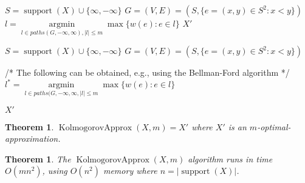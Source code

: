 \documentclass{article}
\newtheorem{theorem}[thm]{Theorem}
\DeclareMathOperator{\support}{support}
\DeclareMathOperator{\KlmApprox}{KolmogorovApprox}
\begin{document}
\begin{algorithm}\label{alg:optapprox}
	\DontPrintSemicolon
	$S = \support(X)\cup \{\infty,-\infty\}$\;
	$G=(V,E)=(S, \{ e=(x,y) \in S^2 \colon  x<y \})$  \;
	$ l = \operatorname{argmin}\limits_{l \in paths(G,-\infty,\infty),|l|\leq m}  \max \{ w(e)\colon e \in l  \}$  \;
	\Return $X'$\;
	
	\caption{$\KlmApprox (X, m)$}  
	\label{alg:sequence}
\end{algorithm}


\begin{algorithm}\label{alg:optapprox}
	\DontPrintSemicolon
	$S = \support(X)\cup \{\infty,-\infty\}$\;
	$G=(V,E)=(S, \{e= (x,y) \in S^2 \colon  x<y \})$ \;
	
	
	/* The following can be obtained, e.g., using the Bellman-Ford algorithm */\;
	$l^*= \operatorname{argmin}\limits_{l \in paths(G, -\infty, \infty,|l|\leq m}  \max \{ w(e)\colon e \in l  \}$ \;
	
	\Return $X'$\;
	
	\caption{$\KlmApprox (X, m)$}  
	\label{alg:sequence}
\end{algorithm}

\begin{theorem}\label{the:algo}
	$\KlmApprox(X,m) = X' $ where $X'$ is an $m$-optimal-approximation.
\end{theorem}


\begin{theorem}\label{the:complexity}
	The $\KlmApprox(X,m)$ algorithm runs in time $O(mn^2)$, using $O(n^2)$ memory where $n=|\support(X)|$.
\end{theorem}
\end{document}
